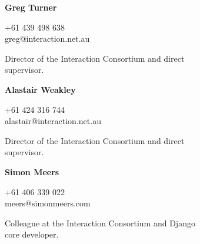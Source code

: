 \documentclass[a4paper,12pt]{article}
\begin{document}
\begin{spacing}{0.95}
\vspace{2mm}
\begin{minipage}[t]{45mm}
	{\small%
		\textbf{\textsf{\color{grey}Greg Turner}}\\
		\vspace{-4mm}\begin{spacing}{0.7}{\footnotesize{\condensed +61 439 498 638\\greg@interaction.net.au}}\\\end{spacing}
		\vspace{-1mm}\begin{spacing}{0.9}{\raggedright Director of the Interaction Consortium and direct\\supervisor.}\end{spacing}%
		\vspace{-5mm}%
	}%
\end{minipage}%
\hspace{5mm}%
\begin{minipage}[t]{45mm}
	{\small%
		\textbf{\textsf{\color{grey}Alastair Weakley}}\\
		\vspace{-4mm}\begin{spacing}{0.7}{\footnotesize{\condensed +61 424 316 744\\alastair@interaction.net.au}}\\\end{spacing}
		\vspace{-1mm}\begin{spacing}{0.9}{\raggedright Director of the Interaction Consortium and direct\\supervisor.}\end{spacing}%
		\vspace{-5mm}%
	}%
\end{minipage}%
\hspace{5mm}%
\begin{minipage}[t]{45mm}
	{\small%
		\textbf{\textsf{\color{grey}Simon Meers}}\\
		\vspace{-4mm}\begin{spacing}{0.7}{\footnotesize{\condensed +61 406 339 022\\meers@simonmeers.com}}\\\end{spacing}
		\vspace{-1mm}\begin{spacing}{0.9}{\raggedright Colleague at the Interaction Consortium and Django\\core developer.}\end{spacing}%
}
\end{minipage}
\end{spacing}
\end{document}
